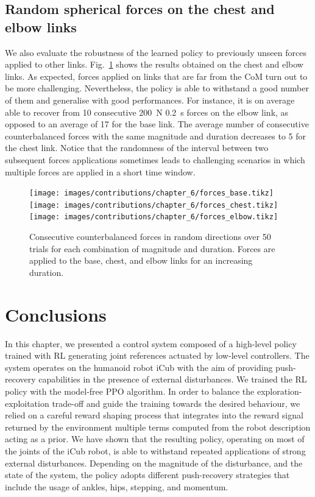 \subsection{Random spherical forces on the chest and elbow links}

We also evaluate the robustness of the learned policy to previously unseen forces applied to other links.
Fig.~\ref{fig:random_forces} shows the results obtained on the chest and elbow links.
As expected, forces applied on links that are far from the \ac{CoM} turn out to be more challenging.
Nevertheless, the policy is able to withstand a good number of them and generalise with good performances.
For instance, it is on average able to recover from 10 consecutive 200~N 0.2~s forces on the elbow link, as opposed to an average of 17 for the base link.
The average number of consecutive counterbalanced forces with the same magnitude and duration decreases to 5 for the chest link.
Notice that the randomness of the interval between two subsequent forces applications sometimes leads to challenging scenarios in which multiple forces are applied in a short time window.

\begin{figure}
    \centering
    \scriptsize
    \texttt{[image: images/contributions/chapter\_6/forces\_base.tikz]}
    \texttt{[image: images/contributions/chapter\_6/forces\_chest.tikz]}
    \texttt{[image: images/contributions/chapter\_6/forces\_elbow.tikz]}
    \caption{Consecutive counterbalanced forces in random directions over 50 trials for each combination of magnitude and duration. Forces are applied to the base, chest, and elbow links for an increasing duration.}
    \label{fig:random_forces}
\end{figure}

\section{Conclusions}

In this chapter, we presented a control system composed of a high-level policy trained with \ac{RL} generating joint references actuated by low-level \pid controllers.
The system operates on the humanoid robot iCub with the aim of providing push-recovery capabilities in the presence of external disturbances.
We trained the \ac{RL} policy with the model-free \ac{PPO} algorithm.
In order to balance the exploration-exploitation trade-off and guide the training towards the desired behaviour, we relied on a careful reward shaping process that integrates into the reward signal returned by the environment multiple terms computed from the robot description acting as a prior.
We have shown that the resulting policy, operating on most of the joints of the iCub robot, is able to withstand repeated applications of strong external disturbances.
Depending on the magnitude of the disturbance, and the state of the system, the policy adopts different push-recovery strategies that include the usage of ankles, hips, stepping, and momentum.

